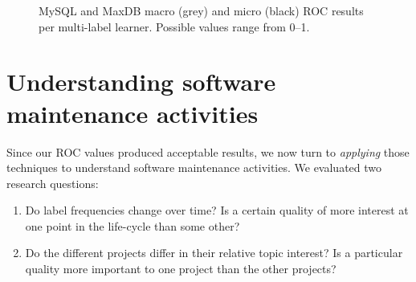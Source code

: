 \documentclass[]{sig-alternate}
\begin{document}
\begin{figure}[]
\centering
{}
\caption[]{MySQL and MaxDB macro (grey) and micro (black) ROC results per multi-label learner. Possible values range from 0--1.
}
\label{fig:mulan}
\end{figure}

\section{Understanding software maintenance activities} 
\label{sec:analysis}
Since our ROC values produced acceptable results, we now turn to \emph{applying} those techniques to understand software maintenance activities. We evaluated two research questions:
\begin{enumerate}
\item Do label frequencies change over time? Is a certain quality of more interest at one point in the life-cycle than some other? 
\item  Do the different projects differ in their relative topic interest? Is a particular quality more important to one project than the other projects?  
\end{enumerate}

\end{document}
